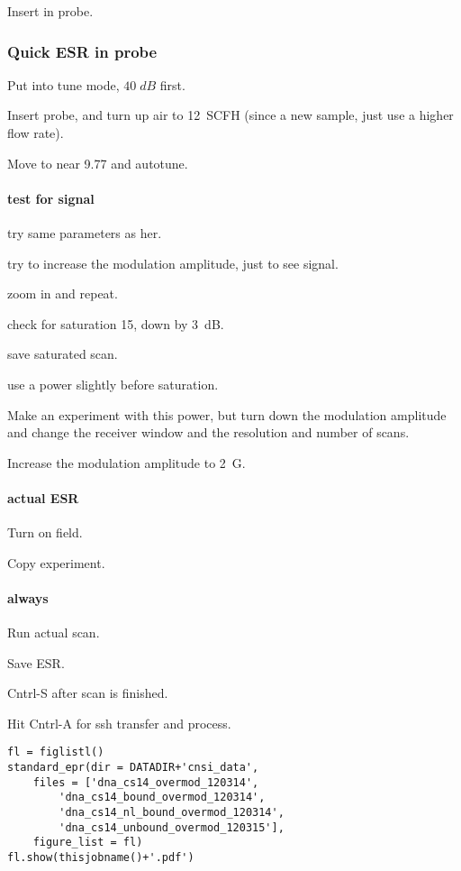 Insert in probe.

\subsubsection{Quick ESR in probe}
Put into tune mode, $40\;dB$ first.

Insert probe, and turn up air to 12~SCFH (since a new sample, just use a higher flow rate).

Move to near 9.77 and autotune.

\paragraph{test for signal}
try same parameters as her.

try to increase the modulation amplitude, just to see signal.

zoom in and repeat.

check for saturation 15, down by 3~dB.

save saturated scan.

use a power slightly before saturation.

Make an experiment with this power, but turn down the modulation amplitude and change the receiver window and the resolution and number of scans.

Increase the modulation amplitude to 2~G.

\paragraph{actual ESR}
Turn on field.

Copy experiment.

\paragraph{always}
Run actual scan.

Save ESR.

Cntrl-S after scan is finished.

Hit Cntrl-A for ssh transfer and process.

\begin{tiny}
\begin{lstlisting}
fl = figlistl()
standard_epr(dir = DATADIR+'cnsi_data',
    files = ['dna_cs14_overmod_120314',
        'dna_cs14_bound_overmod_120314',
        'dna_cs14_nl_bound_overmod_120314',
        'dna_cs14_unbound_overmod_120315'],
    figure_list = fl)
fl.show(thisjobname()+'.pdf')
\end{lstlisting}
\end{tiny}

